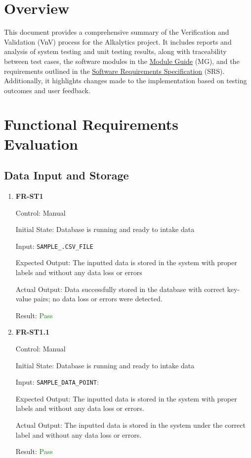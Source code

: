 \documentclass[12pt, titlepage]{article}
\begin{document}
\newpage

\tableofcontents

\listoftables %

\listoffigures %

\newpage


\section{Overview}
This document provides a comprehensive summary of the Verification and
Validation (VnV) process for the Alkalytics project. It includes reports and
analysis of system testing and unit testing results, along with traceability
between test cases, the software modules in the
\href{https://github.com/SumanyaG/Alkalytics/blob/main/docs/Design/MG.pdf}{Module
Guide} (MG), and the requirements outlined in the
\href{https://github.com/SumanyaG/Alkalytics/blob/f856af96669275cc29428a8f2cd4b863e4523ff6/docs/SRS/SRS.pdf}{Software
Requirements Specification} (SRS). Additionally, it highlights changes made to
the implementation based on testing outcomes and user feedback.

\section{Functional Requirements Evaluation}

\subsection{Data Input and Storage}
\begin{enumerate}
  \item{\textbf{FR-ST1}} \label{FR:ST1}

Control: Manual

Initial State: Database is running and ready to intake data

Input: \texttt{SAMPLE\_.CSV\_FILE}

Expected Output: The inputted data is stored in the system with proper labels
and without any data loss or errors

Actual Output: Data successfully stored in the database with correct key-value
pairs; no data loss or errors were detected.

Result: \textcolor{green}{Pass}

\item{\textbf{FR-ST1.1}} \label{FR:ST1.1}

Control: Manual

Initial State: Database is running and ready to intake data

Input: \texttt{SAMPLE\_DATA\_POINT}: 

Expected Output: The inputted data is stored in the system with proper labels
and without any data loss or errors.

Actual Output: The inputted data is stored in the system under the correct label
and without any data loss or errors.

Result: \textcolor{green}{Pass}
\end{enumerate}
\end{document}
